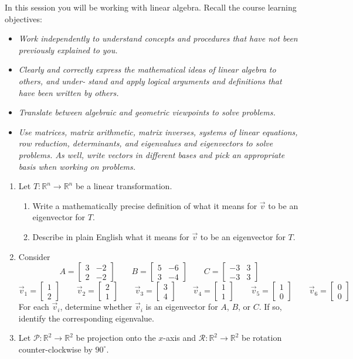 \documentclass[red]{tutorial}
\newcommand{\R}{\mathbb{R}}
\newcommand{\mat}[1]{\begin{bmatrix}#1\end{bmatrix}}
\theoremstyle{definition}
\theoremstyle{theorem}
\begin{document}
	\begin{tutorial}

		\begin{objectives} %
      In this session you will be working with linear algebra. Recall the course learning objectives:
      \begin{itemize}
        \item
          \emph{Work independently to understand concepts and procedures that have not
          been previously explained to you.}
        \item
          \emph{Clearly and correctly express the mathematical ideas of linear
          algebra to others, and under- stand and apply logical arguments and
          definitions that have been written by others.}
        \item
          \emph{Translate between algebraic and geometric viewpoints to solve
          problems.}
        \item
          \emph{Use matrices, matrix arithmetic, matrix inverses, systems of linear
          equations, row reduction, determinants, and eigenvalues and eigenvectors
          to solve problems. As well, write vectors in different bases and pick an
          appropriate basis when working on problems.}
      \end{itemize}
		\end{objectives}

\begin{enumerate}
	\item Let $T:\R^n\to\R^n$ be a linear transformation.
	\begin{enumerate}
		\item Write a mathematically precise definition of what it means for $\vec v$ to be an eigenvector
			for $T$.
		\item Describe in plain English what it means for $\vec v$ to be an eigenvector for $T$.
	\end{enumerate}
	\item Consider
		\[
			A=\mat{3&-2\\2&-2}\qquad
			B=\mat{5&-6\\3&-4}\qquad
			C=\mat{-3&3\\-3&3}
		\]
		\[
			\vec v_1=\mat{1\\2}\qquad
			\vec v_2=\mat{2\\1}\qquad
			\vec v_3=\mat{3\\4}\qquad
			\vec v_4=\mat{1\\1}\qquad
			\vec v_5=\mat{1\\0}\qquad
			\vec v_6=\mat{0\\0}
		\]
		For each $\vec v_i$, determine whether $\vec v_i$ is an eigenvector for $A$, $B$, or $C$. If so,
		identify the corresponding eigenvalue.
	\item Let $\mathcal P:\R^2\to\R^2$ be projection onto the $x$-axis and $\mathcal R:\R^2\to\R^2$ be rotation
		counter-clockwise by $90^\circ$.


\end{enumerate}
\end{tutorial}
\end{document}
